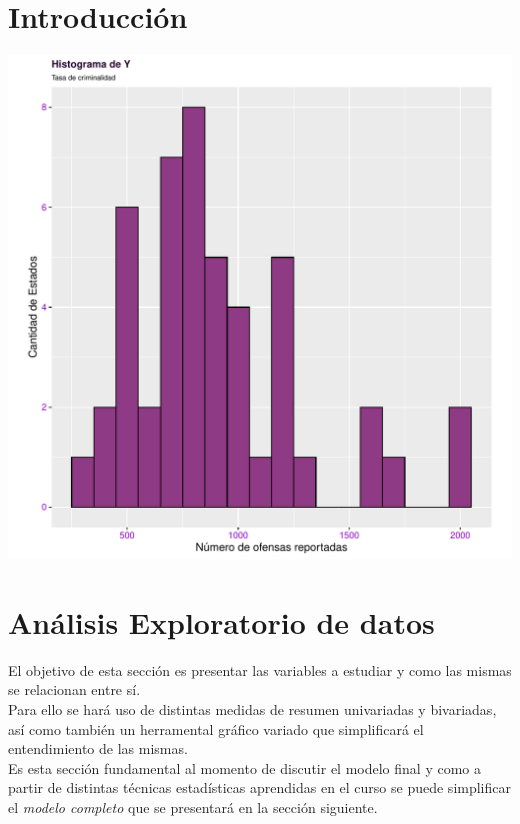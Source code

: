 \documentclass[11pt,a4paper]{article}\usepackage[]{graphicx}\usepackage[]{color}
\makeatletter
\def\maxwidth{ %
  \ifdim\Gin@nat@width>\linewidth
    \linewidth
  \else
    \Gin@nat@width
  \fi
}
\newenvironment{knitrout}{}{} %
\makeatother
\begin{document}
\section{Introducción}
\begin{knitrout}
\color{fgcolor}
\includegraphics[width=\maxwidth]{figure/unnamed-chunk-2-1} 

\end{knitrout}
\newpage
\section{Análisis Exploratorio de datos}

El objetivo de esta sección es presentar las variables a estudiar y como las mismas se relacionan entre sí.
\\

Para ello se hará uso de distintas medidas de resumen univariadas y bivariadas, así como también un herramental gráfico variado que simplificará el entendimiento de las mismas.
\\

Es esta sección fundamental al momento de discutir el modelo final y como a partir de distintas técnicas estadísticas aprendidas en el curso se puede simplificar el \textit{modelo completo} que se presentará en la sección siguiente.
\end{document}
